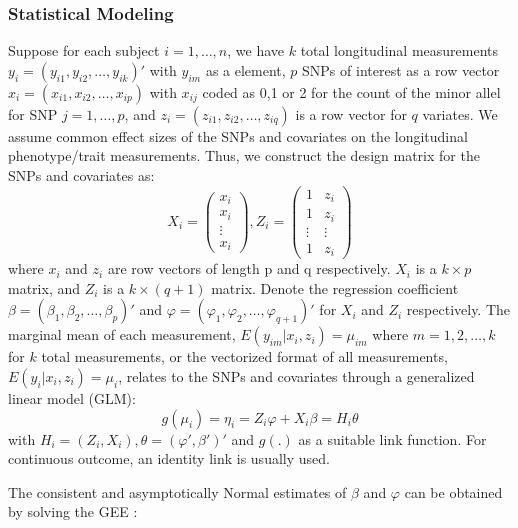 \documentclass[12pt]{article}
\begin{document}
\subsubsection{Statistical Modeling}\label{sec:subsub1-1}
Suppose for each subject $i = 1,\ldots,n$, we have $k$ total longitudinal measurements $y_i = (y_{i1}, y_{i2}, \ldots, y_{ik})'$ with $y_{im}$ as a element, $p$ SNPs of interest as a row vector $x_i = (x_{i1}, x_{i2}, \ldots, x_{ip})$ with $x_{ij}$ coded as 0,1 or 2 for the count of the minor allel for SNP $j = 1, \ldots, p$, and $z_i = (z_{i1}, z_{i2}, \ldots, z_{iq})$ is a row vector for $q$ variates. We assume common effect sizes of the SNPs and covariates on the longitudinal phenotype/trait measurements. Thus, we construct the design matrix for the SNPs and covariates as:
$$
  X_i = \begin{pmatrix}
          x_{i}\\
          x_{i}\\
          \vdots\\
          x_{i}
          \end{pmatrix} 
  , 
  Z_{i}=\begin{pmatrix}1 & z_{i}\\
          1 & z_{i}\\
          \vdots & \vdots\\
          1 & z_{i}
          \end{pmatrix}
$$
where $x_i$ and $z_i$ are row vectors of length p and q respectively. $X_i$ is a $k \times p$ matrix, and $Z_{i}$ is a $k \times (q+1)$ matrix. Denote the regression coefficient $\beta = (\beta_1, \beta_2, \ldots, \beta_p)'$ and $\varphi = (\varphi_1, \varphi_2, \ldots, \varphi_{q+1})'$ for $X_i$ and $Z_i$ respectively. The marginal mean of each measurement, $E(y_{im}|x_i,z_i) = \mu_{im}$ where $m = 1,2, \ldots, k$ for $k$ total measurements, or the vectorized format of all measurements, $E(y_{i}|x_i,z_i) = \mu_{i}$, relates to the SNPs and covariates through a generalized linear model (GLM):
$$
g(\mu_i) = \eta_i = Z_i \varphi + X_i \beta = H_i \theta
$$
\noindent with $H_i = (Z_i, X_i), \theta = (\varphi', \beta')'$ and $g(.)$ as a suitable link function. For continuous outcome, an identity link is usually used.

The consistent and asymptotically Normal estimates of $\beta$ and $\varphi$ can be obtained by solving the GEE \cite{liang1986longitudinal}: 
\end{document}
